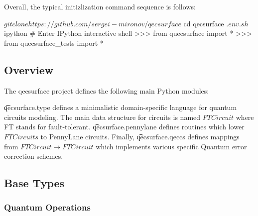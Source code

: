 Overall, the typical initizlization command sequence is follows:

\begin{sh}
$ git clone https://github.com/sergei-mironov/qecsurface
$ cd qecsurface
$ . env.sh
$ ipython # Enter IPython interactive shell
>>> from quecsurface import *
>>> from quecsurface_tests import *
\end{sh}


\subsection{Overview}

The qecsurface project defines the following main Python modules:

\ls \t{qecsurface.type} defines a minimalistic domain-specific language for quantum circuits
    modeling. The main data structure for circuits is named $FTCircuit$ where FT stands for
    fault-tolerant.
\li \t{qecsurface.pennylane} defines routines which lower $FTCircuits$ to PennyLane circuits.
\li Finally, \t{qecsurface.qeccs} defines mappings from $FTCircuit \to FTCircuit$
    which implements various specific Quantum error correction schemes.
\le

\subsection{Base Types}

\subsubsection{Quantum Operations}

  \begin{comment}
    \begin{sh}
    printf '\\begin{%
    cat $PROJECT_ROOT/python/qecsurface/type.py | sedlines.sh 'Quantum operation definitions'
    printf '\\end{%
    \end{sh}
  \end{comment}

